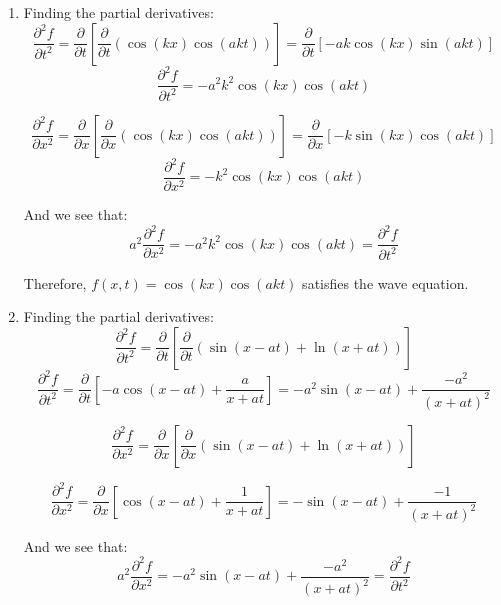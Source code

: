 \begin{Answer}[ref = wave]
\begin{enumerate}
    \item Finding the partial derivatives:
    $$\frac{\partial^2 f}{\partial t^2} = \frac{\partial}{\partial t} \left[ 
    \frac{\partial}{\partial t} \left( \cos{ \left( k x \right)} \cos{ \left( 
    a k t \right)} \right) \right] = \frac{\partial}{\partial t} \left[ -a k 
    \cos{ \left( k x \right)} \sin{ \left( a k t \right)} \right]$$
    $$\frac{\partial^2 f}{\partial t^2} = -a^2 k^2 \cos{ \left( k x \right)} 
    \cos{ \left( a k t \right)}$$

    $$\frac{\partial^2 f}{\partial x^2} = \frac{\partial}{\partial x} \left[ 
    \frac{\partial}{\partial x} \left( \cos{\left( k x \right)}\cos{\left( a k 
    t \right)} \right) \right] = \frac{\partial}{\partial x} \left[ -k \sin{ 
    \left( k x \right)} \cos{ \left( a k t \right)} \right]$$
    $$\frac{\partial^2 f}{\partial x^2} = -k^2 \cos{ \left( k x \right)} \cos{ 
    \left( a k t \right)}$$

    And we see that:
    $$a^2 \frac{\partial^2 f}{\partial x^2} = -a^2 k^2 \cos{ \left( k x 
    \right)} \cos{ \left( a k t \right)} = \frac{\partial^2 f}{\partial t^2}$$

    Therefore, $f(x, t) = \cos{\left( k x \right)}\cos{\left( a k t \right)}$ 
    satisfies the wave equation. 

    \item Finding the partial derivatives:
    $$\frac{\partial^2 f}{\partial t^2} = \frac{\partial}{\partial t} \left[ 
    \frac{\partial}{\partial t} \left( \sin{\left( x - a t \right)} + \ln{ 
    \left( x + a t \right)} \right) \right]$$
    $$\frac{\partial^2 f}{\partial t^2} = \frac{\partial}{\partial t} \left[ 
    -a \cos{ \left( x - a t \right)} + \frac{a}{x + a t} \right] = -a^2 \sin{ 
    \left( x - a t \right)} + \frac{-a^2}{\left( x + a t \right)^2}$$

    $$\frac{\partial^2 f}{\partial x^2} = \frac{\partial}{\partial x} \left[ 
    \frac{\partial}{\partial x} \left( \sin{ \left( x - a t \right)} + \ln{ 
    \left( x + a t \right)} \right) \right]$$

    $$\frac{\partial^2 f}{\partial x^2} = \frac{\partial}{\partial x} \left[ 
    \cos{ \left( x - a t \right)} + \frac{1}{x + a t} \right] = -\sin{ \left( 
    x - a t \right)} + \frac{-1}{\left( x + a t \right)^2}$$

    And we see that:
    $$a^2 \frac{\partial^2 f}{\partial x^2} = -a^2 \sin{ \left( x - a t 
    \right)} + \frac{-a^2}{\left( x + a t \right)^2} = \frac{\partial^2 f}{
    \partial t^2}$$


\end{enumerate}
\end{Answer}
